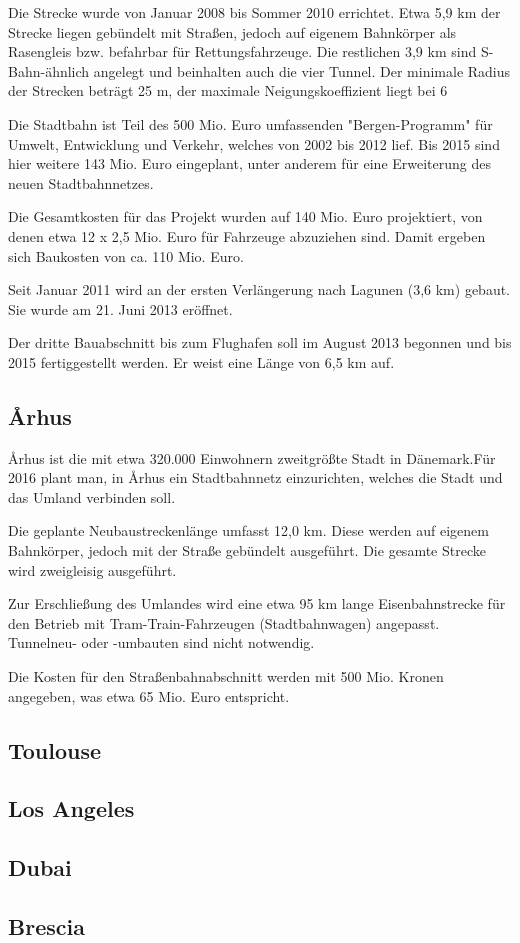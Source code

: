 Die Strecke wurde von Januar 2008 bis Sommer 2010 errichtet. Etwa 5,9 km der Strecke liegen
gebündelt mit Straßen, jedoch auf eigenem Bahnkörper als Rasengleis bzw. befahrbar für
Rettungsfahrzeuge. Die restlichen 3,9 km sind S-Bahn-ähnlich angelegt und beinhalten auch die
vier Tunnel. Der minimale Radius der Strecken beträgt 25 m, der maximale Neigungskoeffizient
liegt bei 6%

Die Stadtbahn ist Teil des 500 Mio. Euro umfassenden "Bergen-Programm" für Umwelt, Entwicklung
und Verkehr, welches von 2002 bis 2012 lief. Bis 2015 sind hier weitere 143 Mio. Euro
eingeplant, unter anderem für eine Erweiterung des neuen Stadtbahnnetzes.

Die Gesamtkosten für das Projekt wurden auf 140 Mio. Euro projektiert, von denen etwa
12 x 2,5 Mio. Euro für Fahrzeuge abzuziehen sind. Damit ergeben sich Baukosten von ca. 110
Mio. Euro.

Seit Januar 2011 wird an der ersten Verlängerung nach Lagunen (3,6 km) gebaut. Sie wurde am
21. Juni 2013 eröffnet.

Der dritte Bauabschnitt bis zum Flughafen soll im August 2013 begonnen und bis 2015 fertiggestellt
werden. Er weist eine Länge von 6,5 km auf.

\subsection{Århus}

Århus ist die mit etwa 320.000 Einwohnern zweitgrößte Stadt in Dänemark.Für 2016 plant man,
in Århus ein Stadtbahnnetz einzurichten, welches die Stadt und das Umland verbinden soll.

Die geplante Neubaustreckenlänge umfasst 12,0 km. Diese werden auf eigenem Bahnkörper, jedoch
mit der Straße gebündelt ausgeführt. Die gesamte Strecke wird zweigleisig ausgeführt.

Zur Erschließung des Umlandes wird eine etwa 95 km lange Eisenbahnstrecke für den Betrieb mit
Tram-Train-Fahrzeugen (Stadtbahnwagen) angepasst. Tunnelneu- oder -umbauten sind nicht
notwendig.

Die Kosten für den Straßenbahnabschnitt werden mit 500 Mio. Kronen angegeben, was etwa 65 Mio.
Euro entspricht.

\subsection{Toulouse}


\subsection{Los Angeles}


\subsection{Dubai}


\subsection{Brescia}






\begin{landscape}

\end{landscape}

